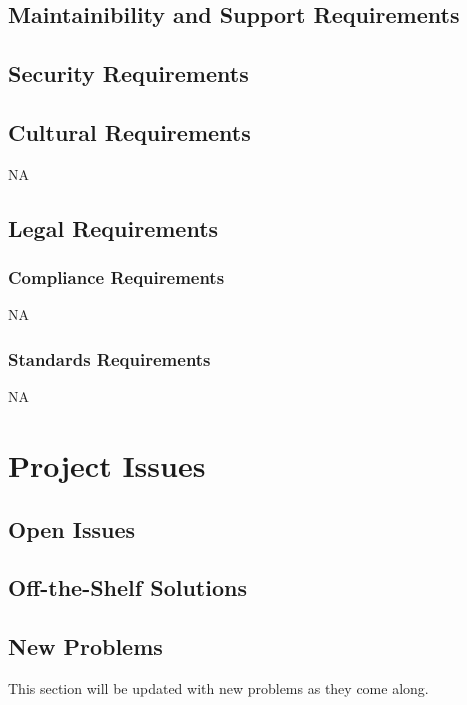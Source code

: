 \documentclass[12pt]{article}
\begin{document}
\subsection{Maintainibility and Support Requirements} %
\subsection{Security Requirements} %
\subsection{Cultural Requirements} %
NA
\subsection{Legal Requirements} %
\subsubsection{Compliance Requirements}
NA
\subsubsection{Standards Requirements}
NA
\section{Project Issues}
\subsection{Open Issues} %
\subsection{Off-the-Shelf Solutions} %
\subsection{New Problems} %
This section will be updated with new problems as they come along.
\end{document}
